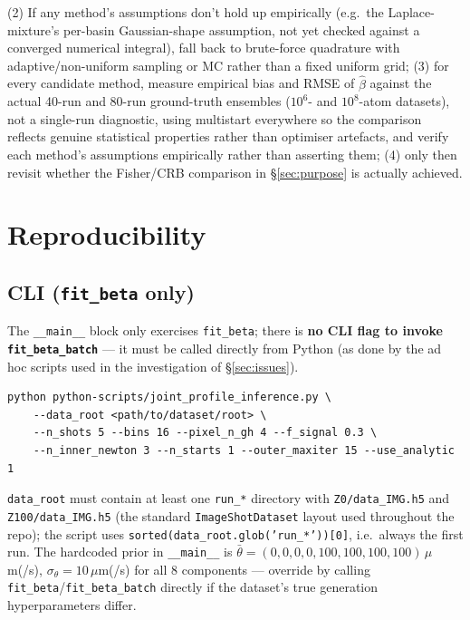 \documentclass[11pt,a4paper]{article}
\newcommand{\code}[1]{\texttt{#1}}
\begin{document}
(2) If any method's assumptions don't hold up empirically (e.g.\ the
Laplace-mixture's per-basin Gaussian-shape assumption, not yet checked
against a converged numerical integral), fall back to brute-force
quadrature with adaptive/non-uniform sampling or MC rather than a fixed
uniform grid; (3) for every candidate method, measure empirical bias and
RMSE of $\hat\beta$ against the actual 40-run and 80-run ground-truth
ensembles ($10^6$- and $10^8$-atom datasets), not a single-run diagnostic,
using multistart everywhere so the comparison reflects genuine
statistical properties rather than optimiser artefacts, and verify each
method's assumptions empirically rather than asserting them; (4) only
then revisit whether the Fisher/CRB comparison in \S\ref{sec:purpose} is
actually achieved.

\section{Reproducibility}
\label{sec:reproducibility}

\subsection{CLI (\code{fit\_beta} only)}

The \code{\_\_main\_\_} block only exercises \code{fit\_beta}; there is
\textbf{no CLI flag to invoke \code{fit\_beta\_batch}} --- it must be
called directly from Python (as done by the ad hoc scripts used in the
investigation of \S\ref{sec:issues}).

\begin{verbatim}
python python-scripts/joint_profile_inference.py \
    --data_root <path/to/dataset/root> \
    --n_shots 5 --bins 16 --pixel_n_gh 4 --f_signal 0.3 \
    --n_inner_newton 3 --n_starts 1 --outer_maxiter 15 --use_analytic 1
\end{verbatim}

\code{data\_root} must contain at least one \code{run\_*} directory with
\code{Z0/data\_IMG.h5} and \code{Z100/data\_IMG.h5} (the standard
\code{ImageShotDataset} layout used throughout the repo); the script uses
\texttt{sorted(data\_root.glob('run\_*'))[0]}, i.e.\ always the
first run. The hardcoded prior in \code{\_\_main\_\_} is
$\bar\theta=(0,0,0,0,100,100,100,100)\,\mu$m(/s),
$\sigma_\theta=10\,\mu$m(/s) for all 8 components --- override by calling
\code{fit\_beta}/\code{fit\_beta\_batch} directly if the dataset's true
generation hyperparameters differ.
\end{document}
